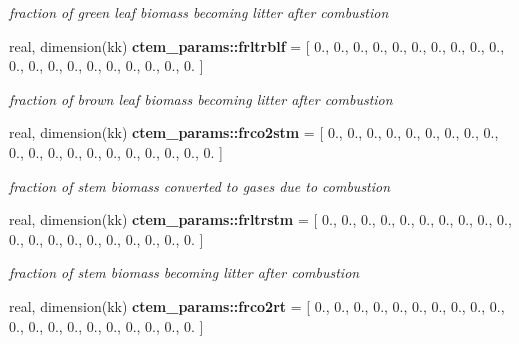 \begin{DoxyCompactItemize}
\begin{DoxyCompactList}\small\item\em fraction of green leaf biomass becoming litter after combustion \end{DoxyCompactList}\item 
\hypertarget{namespacectem__params_a665ceea7e9350e769153df8ce09859c9}{}real, dimension(kk) {\bfseries ctem\+\_\+params\+::frltrblf} = \mbox{[} 0., 0., 0., 0., 0., 0., 0., 0., 0., 0., 0., 0., 0., 0., 0., 0., 0., 0., 0., 0. \mbox{]}\label{namespacectem__params_a665ceea7e9350e769153df8ce09859c9}

\begin{DoxyCompactList}\small\item\em fraction of brown leaf biomass becoming litter after combustion \end{DoxyCompactList}\item 
\hypertarget{namespacectem__params_a16e61987713a7f1a1434ff33d5129cbe}{}real, dimension(kk) {\bfseries ctem\+\_\+params\+::frco2stm} = \mbox{[} 0., 0., 0., 0., 0., 0., 0., 0., 0., 0., 0., 0., 0., 0., 0., 0., 0., 0., 0., 0. \mbox{]}\label{namespacectem__params_a16e61987713a7f1a1434ff33d5129cbe}

\begin{DoxyCompactList}\small\item\em fraction of stem biomass converted to gases due to combustion \end{DoxyCompactList}\item 
\hypertarget{namespacectem__params_a9c2ccc3e7359b88d45fd61fdbf47900c}{}real, dimension(kk) {\bfseries ctem\+\_\+params\+::frltrstm} = \mbox{[} 0., 0., 0., 0., 0., 0., 0., 0., 0., 0., 0., 0., 0., 0., 0., 0., 0., 0., 0., 0. \mbox{]}\label{namespacectem__params_a9c2ccc3e7359b88d45fd61fdbf47900c}

\begin{DoxyCompactList}\small\item\em fraction of stem biomass becoming litter after combustion \end{DoxyCompactList}\item 
\hypertarget{namespacectem__params_ac11f9cbbf331e0bb6bbb5a675fdc4543}{}real, dimension(kk) {\bfseries ctem\+\_\+params\+::frco2rt} = \mbox{[} 0., 0., 0., 0., 0., 0., 0., 0., 0., 0., 0., 0., 0., 0., 0., 0., 0., 0., 0., 0. \mbox{]}\label{namespacectem__params_ac11f9cbbf331e0bb6bbb5a675fdc4543}


\end{DoxyCompactItemize}
